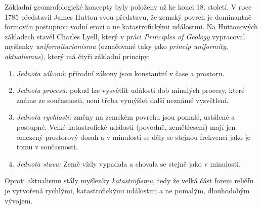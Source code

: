 Základní geomrofologické koncepty byly položeny až ke konci 18. století. V roce 1785 představil James Hutton svou představu, že zemský povrch je dominantně formován postupnou vodní erozí a ne katastrofickými událostmi. Na Huttonových základech stavěl Charles Lyell, který v práci \textit{Principles of Geology} vypracoval myšlenky \emph{uniformitarianismu} (označované taky jako \emph{princip uniformity}, \emph{aktualismus}), který má čtyři základní principy:
\begin{enumerate}
	\item \emph{Jednota zákonů:} přírodní zákony jsou konstantní v čase a prostoru.
	\item \emph{Jednota procesů:} pokud lze vysvětlit události dob minulých procesy, které známe ze současnosti, není třeba vymýšlet další neznámé vysvětlení.
	\item \emph{Jednota rychlosti:} změny na zemském povrchu jsou pomalé, ustálené a postupné. Velké katastrofické události (povodně, zemětřesení) mají jen omezený prostorový dosah a v minulosti se děly se stejnou frekvencí jako je tomu v současnosti.
	\item \emph{Jednota stavu:} Země vždy vypadala a chovala se stejně jako v minulosti.
\end{enumerate}

Oproti aktualismu stály myšlenky \emph{katastrofismu}, tedy že velká část forem reliéfu je vytvořená rychlými, katastrofickými událostmi a ne pomalým, dlouhodobým vývojem. 
%
%

